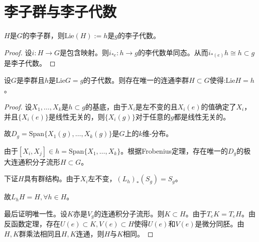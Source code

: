 \section{李子群与李子代数}
\begin{proposition}
    $H$是$G$的李子群，则$\mathrm{Lie}(H):=h$是$g$的李子代数。
\end{proposition}
\begin{proof}
    设$i :H \to G$是包含映射。则$i_{*e}:h \to g$的李代数单同态。从而$i_{*(e)}h \cong h \subset g$是李子代数。
\end{proof}
\begin{proposition}
    设$G$是李群且$h$是$\mathrm{Lie}G=g$的子代数。则存在唯一的连通李群$H\subset G$使得:$\mathrm{Lie}H =h$。
\end{proposition}
\begin{proof}
    设$X_1,\dots,X_k$是$h \subset g$的基底，由于$X_i$是左不变的且$X_i(e)$的值确定了$X_i$，并且$\{X_i(e)\}$是线性无关的，则$\{X_i(g)\}$对于任意的$g$都是线性无关的。

    故$D_g=\mathrm{Span}\{X_1(g),\dots,X_k(g)\}$是$G$上的$k$维-分布。

    由于$[X_i,X_j] \in h=\mathrm{Span}\{X_1,\dots,X_k\}$。根据Frobenius定理，存在唯一的$D_g$的极大连通积分子流形$H \subset G$。

    下证$H$具有群结构。由于$X_i$左不变，$(L_h)_*(S_g)=S_g$。

    故$L_h H=H,\forall h \in H$。

    最后证明唯一性。设$K$亦是$V_g$的连通积分子流形。则$K\subset H$。由于$T_e K=T_eH$。由反函数定理，存在$U(e)\subset K,V(e)\subset H$使得$U(e)$和$V(e)$是微分同胚。由$H,K$群乘法相同且$H,K$连通，则$H$与$K$相同。
\end{proof}
